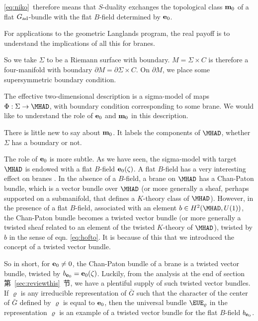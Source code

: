 \eqref{eq:niko}\ therefore means that $S$-duality exchanges the topological
class ${\bf m}_0$ of a flat $G_{\rm{ad}}$-bundle with the flat
$B$-field determined by ${\bf e}_0$.

\par{}

For applications to the geometric Langlands program, the real
payoff is to understand the implications of all this for branes.

So we take $\Sigma$ to be a Riemann surface with boundary.
$M=\Sigma\times C$ is  therefore a four-manifold with boundary
$\partial M=\partial\Sigma\times C$.  On $\partial M$, we place
some supersymmetric boundary condition.

The effective two-dimensional description is a sigma-model of maps
$\Phi:\Sigma\to \MHAD$, with boundary condition corresponding to
some brane.  We would like to understand the role of ${\bf e}_0$
and ${\bf m}_0$ in this description.

There is little new to say about ${\bf m}_0$.  It labels the
components of $\MHAD$, whether $\Sigma$ has a boundary or not.

The role of ${\bf e}_0$ is more subtle.  As we have seen, the
sigma-model with target $\MHAD$ is endowed with a flat $B$-field
${\bf e}_0(\zeta)$. A flat $B$-field has a very interesting effect
on branes \cite{ref102}.  In the absence of a
$B$-field, a brane on $\MHAD$ has a Chan-Paton bundle, which is a
vector bundle over $\MHAD$  (or more generally a sheaf, perhaps
supported on a submanifold, that defines a $K$-theory class of
$\MHAD$). However, in the presence of a flat $B$-field, associated
with an element $b\in H^2(\MHAD,U(1))$, the Chan-Paton bundle
becomes a twisted vector bundle (or more generally a twisted sheaf
related to an element of the twisted $K$-theory of $\MHAD$),
twisted by $b$ in the sense of eqn. \eqref{eq:hofto}.  It is because of this
that we introduced the concept of a twisted vector bundle.

So in short, for ${\bf e}_0\not=0$,  the Chan-Paton bundle of a
brane is a twisted vector bundle, twisted by  $b_{{\bf e}_0}={\bf
e}_0(\zeta)$.  Luckily, from the analysis at the end of section
第~\ref{sec:reviewthis}~节, we have a plentiful supply of such twisted vector
bundles.  If $\varrho$ is any irreducible representation of $\bar
G$ such that the character of the center of $\bar G$ defined by
$\varrho$ is equal to ${\bf e}_0$, then the universal bundle
${\EUE}_\varrho$ in the representation $\varrho$ is an example of
a twisted vector bundle for the flat $B$-field $b_{{\bf e}_0}$.

